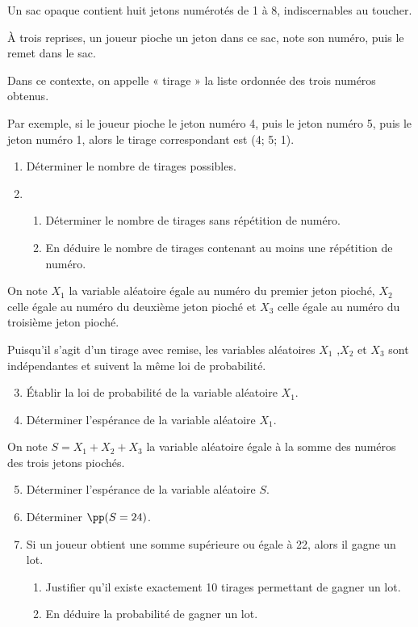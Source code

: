 \documentclass[11pt,fleqn, openany]{book} %
\begin{document}
\begin{exercise}[topic=lgn02, subtitle={(Centres étrangers 2024)}]

Un sac opaque contient huit jetons numérotés de 1 à 8, indiscernables au toucher.

À trois reprises, un joueur pioche un jeton dans ce sac, note son numéro, puis le remet dans le sac.

Dans ce contexte, on appelle « tirage » la liste ordonnée des trois numéros obtenus.

Par exemple, si le joueur pioche le jeton numéro 4, puis le jeton numéro 5, puis le jeton numéro 1, alors le tirage correspondant est (4; 5; 1).
\begin{enumerate}
\item Déterminer le nombre de tirages possibles.
\item \begin{enumerate}
\item Déterminer le nombre de tirages sans répétition de numéro.
\item En déduire le nombre de tirages contenant au moins une répétition de numéro.\end{enumerate}\end{enumerate}
On note $X_1$ la variable aléatoire égale au numéro du premier jeton pioché, $X_2$ celle égale au numéro du deuxième jeton pioché et $X_3$ celle égale au numéro du troisième jeton pioché.

Puisqu'il s'agit d'un tirage avec remise, les variables aléatoires $X_1$ ,$X_2$ et $X_3$ sont indépendantes et suivent la même loi de probabilité.

\begin{enumerate}
\setcounter{enumi}{2}
\item Établir la loi de probabilité de la variable aléatoire $X_1$.
\item Déterminer l'espérance de la variable aléatoire $X_1$.\end{enumerate}

On note $S = X_1 + X_2 + X_3$ la variable aléatoire égale à la somme des numéros des trois jetons piochés.

\begin{enumerate}
\setcounter{enumi}{4}
\item Déterminer l'espérance de la variable aléatoire $S$.
\item Déterminer $\pp(S=24)$.
\item Si un joueur obtient une somme supérieure ou égale à 22, alors il gagne un lot.
\begin{enumerate}
\item Justifier qu'il existe exactement 10 tirages permettant de gagner un lot.
\item En déduire la probabilité de gagner un lot.\end{enumerate}\end{enumerate}

\end{exercise}
\end{document}
